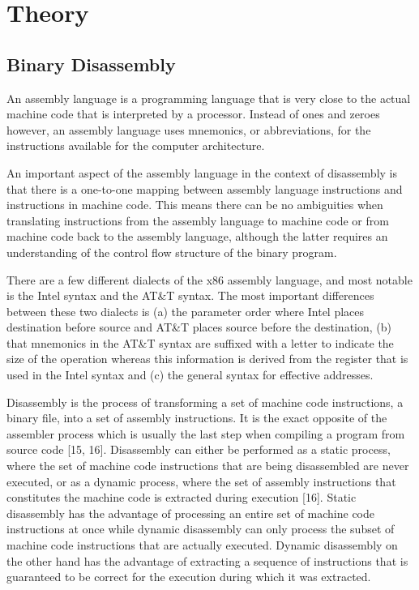 \chapter{Theory}
\section{Binary Disassembly}
An assembly language is a programming language that is very close to the actual machine code that is interpreted by a processor. Instead of ones and zeroes however, an assembly language uses mnemonics, or abbreviations, for the instructions available for the computer architecture.


An important aspect of the assembly language in the context of disassembly is that there is a one-to-one mapping between assembly language instructions and instructions in machine code. This means there can be no ambiguities when translating instructions from the assembly language to machine code or from machine code back to the assembly language, although the latter requires an
understanding of the control flow structure of the binary program.

There are a few different dialects of the x86 assembly language, and most notable is the Intel syntax and the AT\&T syntax. The most important differences between these two dialects is (a) the parameter order where Intel places destination before source and AT\&T places source before the destination, (b) that mnemonics in the AT\&T syntax are suffixed with a letter to indicate the
size of the operation whereas this information is derived from the register that is used in the Intel syntax and (c) the general syntax for effective addresses.


Disassembly is the process of transforming a set of machine code instructions, a binary file, into a set of assembly instructions. It is the exact opposite of the assembler process which is usually the last step when compiling a program from source code [15, 16]. Disassembly can either be performed as a static process, where the set of machine code instructions that are being disassembled are never executed, or as a dynamic process, where the set of assembly instructions
that constitutes the machine code is extracted during execution [16]. Static disassembly has the advantage of processing an entire set of machine code instructions at once while dynamic disassembly can only process the subset of machine code instructions that are actually executed. Dynamic disassembly on the other hand has the advantage of extracting a sequence of instructions that is guaranteed to be correct for the execution during which it was extracted.

